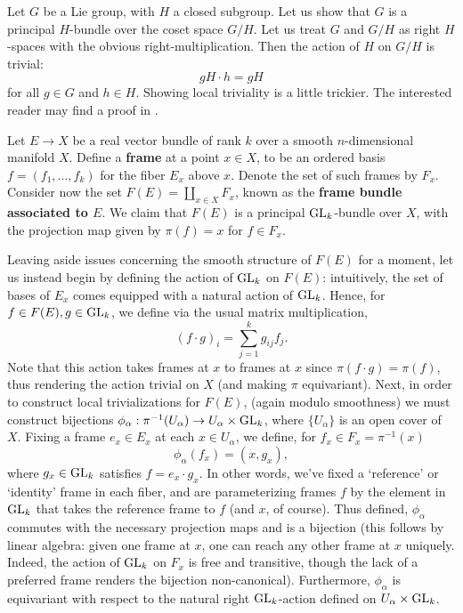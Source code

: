 \begin{exmp}
    Let $G$ be a Lie group, with $H$ a closed subgroup. Let us show that $G$ is a principal $H$-bundle over the coset space $G/H$.
    Let us treat $G$ and $G/H$ as right $H$-spaces with the obvious right-multiplication. Then the action of $H$ on $G/H$ is trivial:
    \[gH\cdot h = gH\]
    for all $g\in G$ and $h\in H$. Showing local triviality is a little trickier. The interested reader may find a proof in .
\end{exmp}

\begin{exmp}
    Let $E\to X$ be a real vector bundle of rank $k$ over a smooth $n$-dimensional manifold $X$.
    Define a \textbf{frame} at a point $x\in X$, to be an ordered basis $f=(f_1,\ldots, f_k)$ for the fiber $E_x$ above $x$. Denote the set of such frames by $F_x$.
    Consider now the set $F(E)=\coprod_{x\in X} F_x$, known as the \textbf{frame bundle associated to $E$}. We claim that $F(E)$ is a principal
    $\operatorname{GL}_k$-bundle over $X$, with the projection map given by $\pi(f)=x$ for $f\in F_x$.

    Leaving aside issues concerning the smooth structure of $F(E)$ for a moment, let us instead begin by defining the action of $\operatorname{GL}_k$ on $F(E)$:
    intuitively, the set of bases of $E_x$ comes equipped with a natural action of $\operatorname{GL}_k$.
    Hence, for $f\in F(E), g\in\operatorname{GL}_k$, we define via the usual matrix multiplication,
    \[(f\cdot g)_i=\sum_{j=1}^kg_{ij}f_j.\]
    Note that this action takes
    frames at $x$ to frames at $x$ since $\pi(f\cdot g)=\pi(f)$, thus rendering the action trivial on $X$ (and making $\pi$ equivariant). Next, in order to construct
    local trivializations for $F(E)$, (again modulo smoothness) we must construct bijections $\phi_\alpha:\pi^{-1}(U_\alpha)\to U_\alpha\times\operatorname{GL}_k$,
    where $\{U_\alpha\}$ is an open cover of $X$. Fixing a frame $e_x\in E_x$ at each $x\in U_\alpha$, we define, for $f_x\in F_x=\pi^{-1}(x)$
    \[\phi_\alpha(f_x)=(x, g_x),\]
    where $g_x\in\operatorname{GL}_k$ satisfies $f=e_x\cdot g_x$. In other words, we've fixed a `reference' or `identity' frame in each fiber, and are parameterizing
    frames $f$ by the element in $\operatorname{GL}_k$ that takes the reference frame to $f$ (and $x$, of course). Thus defined, $\phi_\alpha$ commutes with the
    necessary projection maps and is a bijection (this follows by linear algebra: given one frame at $x$, one can reach any other frame at $x$ uniquely. Indeed,
    the action of $\operatorname{GL}_k$ on $F_x$ is free and transitive, though the lack of a preferred frame renders the bijection non-canonical).
    Furthermore, $\phi_\alpha$ is equivariant with respect to the natural right $\operatorname{GL}_k$-action defined on $U_\alpha\times\operatorname{GL}_k$.


\end{exmp}

